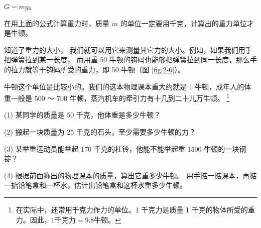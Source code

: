 \centerline{$G = mg$。}

在用上面的公式计算重力时，质量 $m$ 的单位一定要用千克，计算出的重力单位才是牛顿。

知道了重力的大小， 我们就可以用它来测量其它力的大小。例如，如果我们用手把弹簧拉到某一长度，
而用重 50 牛顿的钩码也能够把弹簧拉到同一长度，那么手的拉力就等于钩码所受的重力，即 50 牛顿（图 \ref{fig:2-6}）。

牛顿这个单位是比较小的。我们的这本物理课本重大约就是 1 牛顿，成年人的体重一般是 500 ～ 700 牛顿，蒸汽机车的牵引力有十几到二十儿万牛顿。
\footnote{在实际中，还常用千克力作力的单位。1 千克力是质量 1 千克的物体所受的重力。因此，$1 \text{千克力} =  9.8 \text{牛顿}$。}

\lianxi

(1) 某同学的质量是 50 千克，他体重是多少牛顿？

(2) 搬起一块质量为 25 千克的石头，至少需要多少牛顿的力？

(3) 某举重运动员能举起 170 千克的杠铃，他能不能举起重 1500 牛顿的一块钢锭？

(4) 根据前面称出的\hyperref[celiang-keben-zhiliang]{物理课本的质量}，算出它重多少牛顿。
用手掂一掂课本，再掂一掂铅笔盒和一杯水，估计出铅笔盒和这杯水重多少牛顿。


